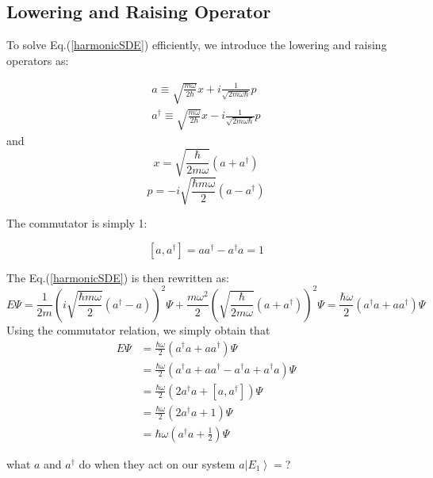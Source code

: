 \subsection{Lowering and Raising Operator}
To solve Eq.(\ref{harmonicSDE}) efficiently, we introduce the lowering and raising operators as:
\begin{qt}
\begin{equation}
\begin{array}{l}
{a \equiv \sqrt{\frac{m \omega}{2 \hbar}} x+i \frac{1}{\sqrt{2 m \omega \hbar}} p} \\
{a^{\dagger} \equiv \sqrt{\frac{m \omega}{2 \hbar}} x-i \frac{1}{\sqrt{2 m \omega \hbar}} p}
\end{array}
\end{equation}
and
$$
x=\sqrt{\frac{\hbar}{2 m \omega}}\left(a+a^{\dagger}\right)
$$
$$
p=-i \sqrt{\frac{\hbar m \omega}{2}}\left(a-a^{\dagger}\right)
$$
\end{qt}
The commutator is simply 1:
\begin{qt}
\begin{equation}
\left[a, a^{\dagger}\right]=a a^{\dagger}-a^{\dagger} a=1
\end{equation}
\end{qt}
The Eq.(\ref{harmonicSDE}) is then rewritten as:
\begin{equation}
E \Psi= \frac{1}{2 m}\left(i \sqrt{\frac{\hbar m \omega}{2}}\left(a^{\dagger}-a\right)\right)^{2} \Psi+\frac{m \omega^{2}}{2}\left(\sqrt{\frac{\hbar}{2 m \omega}}\left(a+a^{\dagger}\right)\right)^{2} \Psi=\frac{\hbar \omega}{2}\left(a^{\dagger} a+a a^{\dagger}\right)\Psi
\end{equation}
Using the commutator relation, we simply obtain that
$$
\begin{aligned}
E \Psi &=\frac{\hbar \omega}{2}\left(a^{\dagger} a+a a^{\dagger}\right)\Psi \\
&=\frac{\hbar \omega}{2}\left(a^{\dagger} a+a a^{\dagger}-a^{\dagger} a+a^{\dagger} a\right)\Psi \\
&=\frac{\hbar \omega}{2}\left(2 a^{\dagger} a+\left[a, a^{\dagger}\right]\right)\Psi \\
&=\frac{\hbar \omega}{2}\left(2 a^{\dagger} a+1\right)\Psi \\
&=\hbar \omega\left(a^{\dagger} a+\frac{1}{2}\right)\Psi
\end{aligned}
$$
\begin{mybox}
\begin{center}
      what $a$ and $a^{\dagger}$ do when they act on our system $a\left|E_{1}\right\rangle=$?
\end{center}
\end{mybox}
